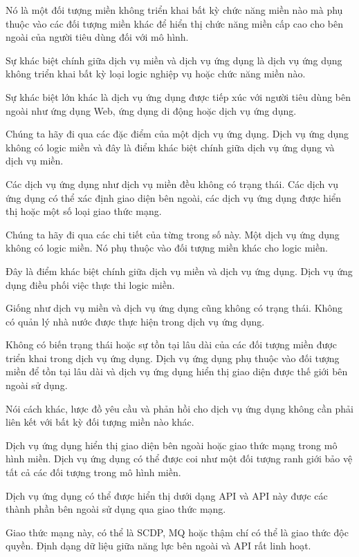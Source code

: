 Nó là một đối tượng miền không triển khai bất kỳ chức năng miền nào mà phụ thuộc vào các đối tượng miền khác để hiển thị chức năng miền cấp cao cho bên ngoài của người tiêu dùng đối với mô hình.

Sự khác biệt chính giữa dịch vụ miền và dịch vụ ứng dụng là dịch vụ ứng dụng không triển khai bất kỳ loại logic nghiệp vụ hoặc chức năng miền nào.

Sự khác biệt lớn khác là dịch vụ ứng dụng được tiếp xúc với người tiêu dùng bên ngoài như ứng dụng Web, ứng dụng di động hoặc dịch vụ ứng dụng.

Chúng ta hãy đi qua các đặc điểm của một dịch vụ ứng dụng. Dịch vụ ứng dụng không có logic miền và đây là điểm khác biệt chính giữa dịch vụ ứng dụng và dịch vụ miền.

Các dịch vụ ứng dụng như dịch vụ miền đều không có trạng thái. Các dịch vụ ứng dụng có thể xác định giao diện bên ngoài, các dịch vụ ứng dụng được hiển thị hoặc một số loại giao thức mạng.

Chúng ta hãy đi qua các chi tiết của từng trong số này. Một dịch vụ ứng dụng không có logic miền. Nó phụ thuộc vào đối tượng miền khác cho logic miền.

Đây là điểm khác biệt chính giữa dịch vụ miền và dịch vụ ứng dụng. Dịch vụ ứng dụng điều phối việc thực thi logic miền.

Giống như dịch vụ miền và dịch vụ ứng dụng cũng không có trạng thái. Không có quản lý nhà nước được thực hiện trong dịch vụ ứng dụng.

Không có biến trạng thái hoặc sự tồn tại lâu dài của các đối tượng miền được triển khai trong dịch vụ ứng dụng. Dịch vụ ứng dụng phụ thuộc vào đối tượng miền để tồn tại lâu dài và dịch vụ ứng dụng hiển thị giao diện được thế giới bên ngoài sử dụng.

Nói cách khác, lược đồ yêu cầu và phản hồi cho dịch vụ ứng dụng không cần phải liên kết với bất kỳ đối tượng miền nào khác.

Dịch vụ ứng dụng hiển thị giao diện bên ngoài hoặc giao thức mạng trong mô hình miền. Dịch vụ ứng dụng có thể được coi như một đối tượng ranh giới bảo vệ tất cả các đối tượng trong mô hình miền.

Dịch vụ ứng dụng có thể được hiển thị dưới dạng API và API này được các thành phần bên ngoài sử dụng qua giao thức mạng.

Giao thức mạng này, có thể là SCDP, MQ hoặc thậm chí có thể là giao thức độc quyền. Định dạng dữ liệu giữa năng lực bên ngoài và API rất linh hoạt.

